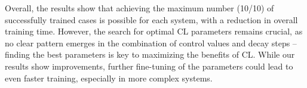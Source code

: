 Overall, the results show that achieving the maximum number (10/10) of successfully trained cases is possible for each system, with a reduction in overall training time. However, the search for optimal CL parameters remains crucial, as no clear pattern emerges in the combination of control values and decay steps -- finding the best parameters is key to maximizing the benefits of CL. While our results show improvements, further fine-tuning of the parameters could lead to even faster training, especially in more complex systems.